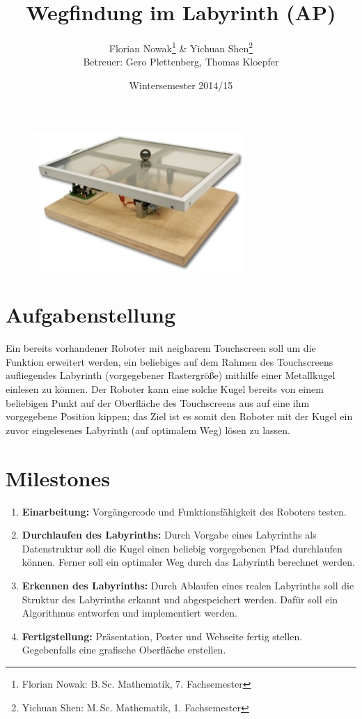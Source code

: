 \documentclass[ngerman]{scrartcl}
\title{Wegfindung im Labyrinth (AP)}
\author{
    Florian Nowak\footnote{Florian Nowak: B.\,Sc. Mathematik, 7. Fachsemester}\; \& Yichuan Shen\footnote{Yichuan Shen: M.\,Sc. Mathematik, 1. Fachsemester}\\
    Betreuer: Gero Plettenberg, Thomas Kloepfer
}
\date{Wintersemester 2014/15}
\begin{document}

\maketitle

\begin{figure}[h]
    \centering
    \includegraphics[scale=.5]{platzhalter}
\end{figure}

\section*{Aufgabenstellung}

Ein bereits vorhandener Roboter mit neigbarem Touchscreen soll um die Funktion erweitert werden, ein beliebiges auf dem Rahmen des Touchscreens aufliegendes Labyrinth (vorgegebener Rastergröße) mithilfe einer Metallkugel einlesen zu können. Der Roboter kann eine solche Kugel bereits von einem beliebigen Punkt auf der Oberfläche des Touchscreens aus auf eine ihm vorgegebene Position kippen; das Ziel ist es somit den Roboter mit der Kugel ein zuvor eingelesenes Labyrinth (auf optimalem Weg) lösen zu lassen.

\section*{Milestones}
\begin{enumerate}
    \item \textbf{Einarbeitung:} Vorgängercode und Funktionsfähigkeit des Roboters testen.
    \item \textbf{Durchlaufen des Labyrinths:} Durch Vorgabe eines Labyrinths als Datenstruktur soll die Kugel einen beliebig vorgegebenen Pfad durchlaufen können. Ferner soll ein optimaler Weg durch das Labyrinth berechnet werden.
    \item \textbf{Erkennen des Labyrinths:} Durch Ablaufen eines realen Labyrinths soll die Struktur des Labyrinths erkannt und abgespeichert werden. Dafür soll ein Algorithmus entworfen und implementiert werden.
    \item \textbf{Fertigstellung:} Präsentation, Poster und Webseite fertig stellen. Gegebenfalls eine grafische Oberfläche erstellen.
\end{enumerate}
\end{document}
